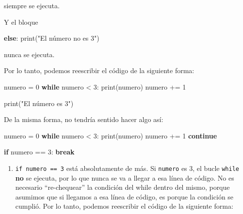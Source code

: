 \documentclass[
  letterpaper,
  DIV=11,
  numbers=noendperiod]{scrreprt}
\newenvironment{Shaded}{\begin{snugshade}}{\end{snugshade}}
\newcommand{\BuiltInTok}[1]{\textcolor[rgb]{0.00,0.23,0.31}{#1}}
\newcommand{\ControlFlowTok}[1]{\textcolor[rgb]{0.00,0.23,0.31}{\textbf{#1}}}
\newcommand{\DecValTok}[1]{\textcolor[rgb]{0.68,0.00,0.00}{#1}}
\newcommand{\NormalTok}[1]{\textcolor[rgb]{0.00,0.23,0.31}{#1}}
\newcommand{\OperatorTok}[1]{\textcolor[rgb]{0.37,0.37,0.37}{#1}}
\newcommand{\StringTok}[1]{\textcolor[rgb]{0.13,0.47,0.30}{#1}}
\providecommand{\tightlist}{%
  \setlength{\itemsep}{0pt}\setlength{\parskip}{0pt}}\usepackage{longtable,booktabs,array}
\begin{document}
siempre se ejecuta.

Y el bloque

\begin{Shaded}
\begin{Highlighting}[]
\ControlFlowTok{else}\NormalTok{:}
  \BuiltInTok{print}\NormalTok{(}\StringTok{"El número no es 3"}\NormalTok{)}
\end{Highlighting}
\end{Shaded}

nunca se ejecuta.

Por lo tanto, podemos reescribir el código de la siguiente forma:

\begin{Shaded}
\begin{Highlighting}[]
\NormalTok{numero }\OperatorTok{=} \DecValTok{0}
\ControlFlowTok{while}\NormalTok{ numero }\OperatorTok{\textless{}} \DecValTok{3}\NormalTok{:}
  \BuiltInTok{print}\NormalTok{(numero)}
\NormalTok{  numero }\OperatorTok{+=} \DecValTok{1}

\BuiltInTok{print}\NormalTok{(}\StringTok{"El número es 3"}\NormalTok{)}
\end{Highlighting}
\end{Shaded}

\hfill\break
De la misma forma, no tendría sentido hacer algo así:

\begin{Shaded}
\begin{Highlighting}[]
\NormalTok{numero }\OperatorTok{=} \DecValTok{0} 
\ControlFlowTok{while}\NormalTok{ numero }\OperatorTok{\textless{}} \DecValTok{3}\NormalTok{:}
  \BuiltInTok{print}\NormalTok{(numero)}
\NormalTok{  numero }\OperatorTok{+=} \DecValTok{1}
  \ControlFlowTok{continue}

  \ControlFlowTok{if}\NormalTok{ numero }\OperatorTok{==} \DecValTok{3}\NormalTok{:}
    \ControlFlowTok{break}
\end{Highlighting}
\end{Shaded}

\begin{enumerate}
\def\labelenumi{\arabic{enumi}.}
\tightlist
\item
  \texttt{if\ numero\ ==\ 3} está absolutamente de más. Si
  \texttt{numero} es 3, el bucle \texttt{while} \textbf{no} se ejecuta,
  por lo que nunca se va a llegar a esa línea de código. No es necesario
  ``re-chequear'' la condición del while dentro del mismo, porque
  asumimos que si llegamos a esa línea de código, es porque la condición
  se cumplió. Por lo tanto, podemos reescribir el código de la siguiente
  forma:
\end{enumerate}
\end{document}
